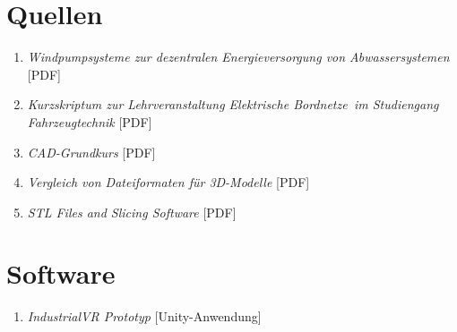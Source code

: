 

\appendix
\renewcommand\thesection{\Alph{section}}

\section{Quellen}

\begin{enumerate}[label=A\arabic*]

\item \textit{Windpumpsysteme zur dezentralen Energieversorgung von Abwassersystemen} [PDF]
\item \textit{Kurzskriptum zur Lehrveranstaltung \glqq Elektrische Bordnetze\grqq\, im Studiengang Fahrzeugtechnik} [PDF]
\item \textit{CAD-Grundkurs} [PDF]
\item \textit{Vergleich von Dateiformaten für 3D-Modelle} [PDF] 
\item \textit{STL Files and Slicing Software} [PDF] 
\end{enumerate}

\section{Software}

\begin{enumerate}[label=B\arabic*]

\item \textit{IndustrialVR Prototyp} [Unity-Anwendung]

\end{enumerate}
